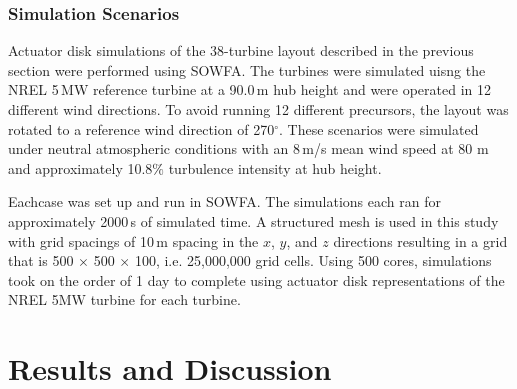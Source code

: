 \documentclass[conf]{new-aiaa}
\begin{document}
\subsubsection{Simulation Scenarios}

Actuator disk simulations of the 38-turbine layout described in the previous section were performed using SOWFA.  The turbines were simulated uisng the NREL 5\,MW reference turbine \cite{jonkman2009definition} at a 90.0\,m hub height and were operated in 12 different wind directions. To avoid running 12 different precursors, the layout was rotated to a reference wind direction of 270$^\circ$.  These scenarios were simulated under neutral atmospheric conditions with an 8\,m/s mean wind speed at 80 m and approximately 10.8$\%$ turbulence intensity at hub height.

Eachcase was set up and run in SOWFA.  The simulations each ran for approximately 2000\,s of simulated time.  A structured mesh is used in this study with grid spacings of 10\,m spacing in the $x$, $y$, and $z$ directions resulting in a grid that is 500 $\times$ 500 $\times$ 100, i.e. 25,000,000 grid cells.  Using 500 cores, simulations took on the order of 1 day to complete using actuator disk representations of the NREL 5MW turbine for each turbine.  




\section{Results and Discussion}
\end{document}
